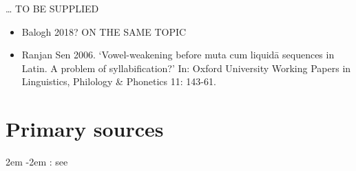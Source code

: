 \documentclass[11pt]{book}
\begin{document}
\ldots{} TO BE SUPPLIED




\begin{itemize}
\item
  Balogh 2018? ON THE SAME TOPIC
\item
  Ranjan Sen 2006. `Vowel-weakening before muta cum liquidā sequences in
  Latin. A problem of syllabification?' In: Oxford University Working
  Papers in Linguistics, Philology \& Phonetics 11: 143-61.
\end{itemize}




\vfill
\pagebreak

\noindent
\textsanskrit{\large 
}





\section{Primary sources}



\leftskip2em
\parindent-2em
: see 
\end{document}
